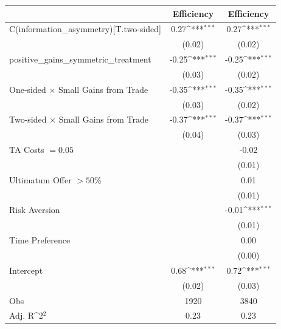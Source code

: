 {
\def\sym#1{\ifmmode^{#1}\else\(^{#1}\)\fi}
\begin{tabular}{@{\extracolsep{2pt}}l*{2}{c}@{}}
\hline\hline


 & Efficiency & Efficiency \\
\hline
C(information\_asymmetry)[T.two-sided] & 0.27\sym{***} & 0.27\sym{***} \\
 & (0.02) & (0.02) \\
positive\_gains\_symmetric\_treatment & -0.25\sym{***} & -0.25\sym{***} \\
 & (0.03) & (0.02) \\
One-sided $\times$ Small Gains from Trade & -0.35\sym{***} & -0.35\sym{***} \\
 & (0.03) & (0.02) \\
Two-sided $\times$ Small Gains from Trade & -0.37\sym{***} & -0.37\sym{***} \\
 & (0.04) & (0.03) \\
TA Costs $= 0.05$ &  & -0.02 \\
 &  & (0.01) \\
Ultimatum Offer $>50\%$ &  & 0.01 \\
 &  & (0.01) \\
Risk Aversion &  & -0.01\sym{***} \\
 &  & (0.01) \\
Time Preference &  & 0.00 \\
 &  & (0.00) \\
Intercept & 0.68\sym{***} & 0.72\sym{***} \\
 & (0.02) & (0.03) \\

\hline
Obs & 1920 & 3840 \\
Adj. R\sym{2} & 0.23 & 0.23 \\
\hline\hline
\end{tabular}
}
